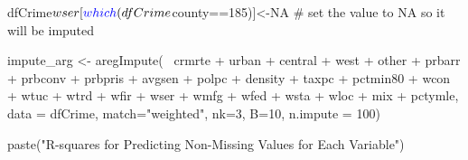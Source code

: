 \documentclass[]{article}
\newenvironment{Shaded}{}{}
\newcommand{\CommentTok}[1]{\textcolor[rgb]{0.00,0.50,0.00}{#1}}
\newcommand{\DataTypeTok}[1]{#1}
\newcommand{\DecValTok}[1]{#1}
\newcommand{\KeywordTok}[1]{\textcolor[rgb]{0.00,0.00,1.00}{#1}}
\newcommand{\NormalTok}[1]{#1}
\newcommand{\OperatorTok}[1]{#1}
\newcommand{\OtherTok}[1]{\textcolor[rgb]{1.00,0.25,0.00}{#1}}
\newcommand{\StringTok}[1]{\textcolor[rgb]{0.00,0.50,0.50}{#1}}
\begin{document}
\begin{Shaded}
\begin{Highlighting}[]
\NormalTok{dfCrime}\OperatorTok{$}\NormalTok{wser[}\KeywordTok{which}\NormalTok{(dfCrime}\OperatorTok{$}\NormalTok{county}\OperatorTok{==}\DecValTok{185}\NormalTok{)]<-}\OtherTok{NA} \CommentTok{# set the value to NA so it will be imputed}
\end{Highlighting}
\end{Shaded}

\begin{Shaded}
\begin{Highlighting}[]
\NormalTok{impute_arg <-}\StringTok{ }\KeywordTok{aregImpute}\NormalTok{(}\OperatorTok{~}\StringTok{ }\NormalTok{crmrte }\OperatorTok{+}\StringTok{  }\NormalTok{urban }\OperatorTok{+}\StringTok{ }\NormalTok{central }\OperatorTok{+}\StringTok{ }\NormalTok{west }\OperatorTok{+}\StringTok{ }\NormalTok{other }\OperatorTok{+}
\StringTok{                         }\NormalTok{prbarr }\OperatorTok{+}\StringTok{ }\NormalTok{prbconv }\OperatorTok{+}\StringTok{ }\NormalTok{prbpris }\OperatorTok{+}\StringTok{ }\NormalTok{avgsen }\OperatorTok{+}\StringTok{ }\NormalTok{polpc }\OperatorTok{+}\StringTok{ }
\StringTok{                         }\NormalTok{density }\OperatorTok{+}\StringTok{ }\NormalTok{taxpc }\OperatorTok{+}\StringTok{ }\NormalTok{pctmin80 }\OperatorTok{+}\StringTok{ }\NormalTok{wcon }\OperatorTok{+}\StringTok{ }\NormalTok{wtuc }\OperatorTok{+}
\StringTok{                         }\NormalTok{wtrd }\OperatorTok{+}\StringTok{ }\NormalTok{wfir }\OperatorTok{+}\StringTok{ }\NormalTok{wser }\OperatorTok{+}\StringTok{ }\NormalTok{wmfg }\OperatorTok{+}\StringTok{ }\NormalTok{wfed }\OperatorTok{+}\StringTok{ }\NormalTok{wsta }\OperatorTok{+}\StringTok{ }\NormalTok{wloc }\OperatorTok{+}
\StringTok{                         }\NormalTok{mix }\OperatorTok{+}\StringTok{ }\NormalTok{pctymle, }\DataTypeTok{data =}\NormalTok{ dfCrime, }\DataTypeTok{match=}\StringTok{"weighted"}\NormalTok{,}
                         \DataTypeTok{nk=}\DecValTok{3}\NormalTok{, }\DataTypeTok{B=}\DecValTok{10}\NormalTok{, }\DataTypeTok{n.impute =} \DecValTok{100}\NormalTok{)}
\end{Highlighting}
\end{Shaded}

\begin{Shaded}
\begin{Highlighting}[]
\KeywordTok{paste}\NormalTok{(}\StringTok{"R-squares for Predicting Non-Missing Values for Each Variable"}\NormalTok{)}
\end{Highlighting}
\end{Shaded}
\end{document}
